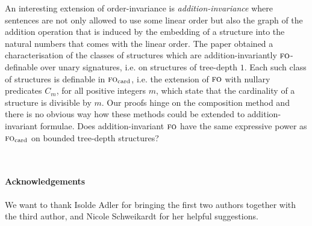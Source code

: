\documentclass[11pt]{article}
\newcommand{\logic}[1]{\textsc{#1}}
\newcommand{\FO}{\logic{fo}}
\begin{document}
An interesting extension of order-invariance is
\emph{addition-invariance} where sentences are not only allowed to use
some linear order but also the graph of the addition operation that is
induced by the embedding of a structure into the natural numbers that
comes with the linear order.  The paper \cite{Schweikardt2010}
obtained a characterisation of the classes of structures which are
addition-invariantly $\FO{}$-definable over unary signatures, i.e. on
structures of tree-depth $1$.  Each such class of structures is
definable in $\FO{}_{\textup{card}}$, i.e. the extension of $\FO{}$
with nullary predicates $C_{m}$, for all positive integers $m$, which
state that the cardinality of a structure is divisible by $m$.  Our
proofs hinge on the composition method and there is no obvious way how
these methods could be extended to addition-invariant formulae.  Does
addition-invariant $\FO{}$ have the same expressive power as
$\FO{}_{\textup{card}}$ on bounded tree-depth structures?




\
\paragraph{Acknowledgements} 

We want to thank Isolde Adler for bringing the first two authors together with
the third author, and Nicole Schweikardt for her helpful suggestions.



\end{document}
